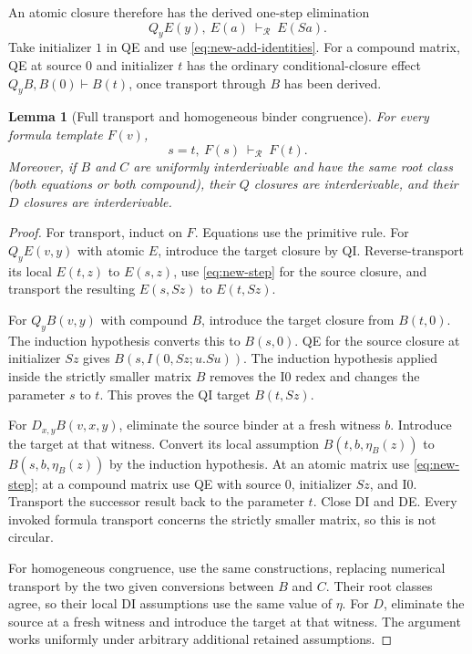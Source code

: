 \documentclass[11pt,a4paper]{article}
\newtheorem{lemma}[theorem]{Lemma}
\theoremstyle{definition}
\begin{document}
An atomic closure therefore has the derived one-step elimination
\begin{equation}
 Q_yE(y),\ E(a)\ \vdash_{\mathcal R}\ E(Sa).
 \label{eq:new-step}
\end{equation}
Take initializer $1$ in QE and use \eqref{eq:new-add-identities}.
For a compound matrix, QE at source $0$ and initializer $t$ has the ordinary
conditional-closure effect $Q_yB,B(0)\vdash B(t)$, once transport through
$B$ has been derived.

\begin{lemma}[Full transport and homogeneous binder congruence]
\label{lem:new-transport}
For every formula template $F(v)$,
\begin{equation}
 s=t,\ F(s)\ \vdash_{\mathcal R}\ F(t).
 \label{eq:new-full-tr}
\end{equation}
Moreover, if $B$ and $C$ are uniformly interderivable and have the same root
class (both equations or both compound), their $Q$ closures are
interderivable, and their $D$ closures are interderivable.
\end{lemma}
\begin{proof}
For transport, induct on $F$.  Equations use the primitive rule.  For
$Q_yE(v,y)$ with atomic $E$, introduce the target closure by QI.
Reverse-transport its local $E(t,z)$ to $E(s,z)$, use
\eqref{eq:new-step} for the source closure, and transport the resulting
$E(s,Sz)$ to $E(t,Sz)$.

For $Q_yB(v,y)$ with compound $B$, introduce the target closure from
$B(t,0)$.  The induction hypothesis converts this to $B(s,0)$.
QE for the source closure at initializer $Sz$ gives
$B(s,I(0,Sz;u.Su))$.  The induction hypothesis applied inside the strictly
smaller matrix $B$ removes the I0 redex and changes the parameter $s$ to $t$.
This proves the QI target $B(t,Sz)$.

For $D_{x,y}B(v,x,y)$, eliminate the source binder at a fresh witness $b$.
Introduce the target at that witness.  Convert its local assumption
$B(t,b,\eta_B(z))$ to $B(s,b,\eta_B(z))$ by the induction hypothesis.
At an atomic matrix use \eqref{eq:new-step}; at a compound matrix use QE
with source $0$, initializer $Sz$, and I0.  Transport the successor result
back to the parameter $t$.  Close DI and DE.  Every invoked formula
transport concerns the strictly smaller matrix, so this is not circular.

For homogeneous congruence, use the same constructions, replacing numerical
transport by the two given conversions between $B$ and $C$.  Their root
classes agree, so their local DI assumptions use the same value of $\eta$.
For $D$, eliminate the source at a fresh witness and introduce the target
at that witness.  The argument works uniformly under arbitrary additional
retained assumptions.
\end{proof}
\end{document}
